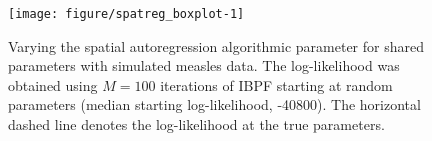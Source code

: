 \documentclass[12pt]{article}\usepackage[]{graphicx}\usepackage[]{xcolor}
\newenvironment{knitrout}{}{} %
\begin{document}


\newpage


\vspace{3mm}


\vspace{-5mm}

\begin{knitrout}
\color{fgcolor}\begin{figure}[h]

\texttt{[image: figure/spatreg\_boxplot-1]} \hfill{}

\caption[Varying the spatial autoregression algorithmic parameter for shared parameters with simulated measles data]{Varying the spatial autoregression algorithmic parameter for shared parameters with simulated measles data. The log-likelihood was obtained using $M=100$ iterations of IBPF starting at random parameters (median starting log-likelihood, -40800). The horizontal dashed line denotes the log-likelihood at the true parameters.}\label{fig:spatreg_boxplot}
\end{figure}

\end{knitrout}
\end{document}
